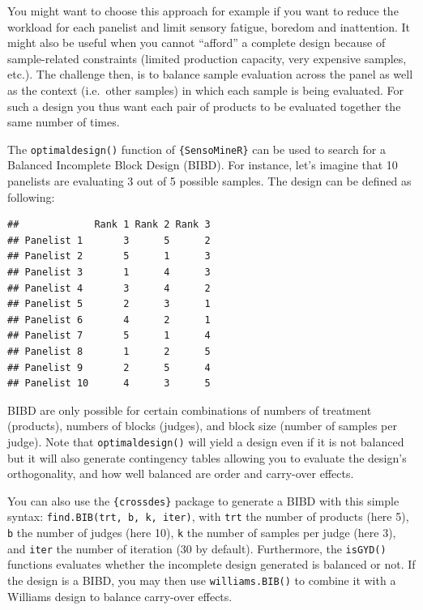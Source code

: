 \documentclass[
]{krantz}
\makeatletter
\newenvironment{Shaded}{\begin{snugshade}}{\end{snugshade}}
\newcommand{\AttributeTok}[1]{\textcolor[rgb]{0.61,0.61,0.61}{#1}}
\newcommand{\DecValTok}[1]{\textcolor[rgb]{0.06,0.06,0.06}{#1}}
\newcommand{\FunctionTok}[1]{\textcolor[rgb]{0,0,0}{#1}}
\newcommand{\NormalTok}[1]{#1}
\newcommand{\OtherTok}[1]{\textcolor[rgb]{0.37,0.37,0.37}{#1}}
\newcommand{\SpecialCharTok}[1]{\textcolor[rgb]{0,0,0}{#1}}
\newenvironment{kframe}{%
\medskip{}
\setlength{\fboxsep}{.8em}
 \def\at@end@of@kframe{}%
 \ifinner\ifhmode%
  \def\at@end@of@kframe{\end{minipage}}%
  \begin{minipage}{\columnwidth}%
 \fi\fi%
 \def\FrameCommand##1{\hskip\@totalleftmargin \hskip-\fboxsep
 \colorbox{shadecolor}{##1}\hskip-\fboxsep
     \hskip-\linewidth \hskip-\@totalleftmargin \hskip\columnwidth}%
 \MakeFramed {\advance\hsize-\width
   \@totalleftmargin\z@ \linewidth\hsize
   \@setminipage}}%
 {\par\unskip\endMakeFramed%
 \at@end@of@kframe}
\renewenvironment{Shaded}{\begin{kframe}}{\end{kframe}}
\makeatother
\begin{document}
You might want to choose this approach for example if you want to reduce the workload for each panelist and limit sensory fatigue, boredom and inattention. It might also be useful when you cannot ``afford'' a complete design because of sample-related constraints (limited production capacity, very expensive samples, etc.). The challenge then, is to balance sample evaluation across the panel as well as the context (i.e.~other samples) in which each sample is being evaluated. For such a design you thus want each pair of products to be evaluated together the same number of times.

The \texttt{optimaldesign()} function of \texttt{\{SensoMineR\}} can be used to search for a Balanced Incomplete Block Design (BIBD). For instance, let's imagine that 10 panelists are evaluating 3 out of 5 possible samples. The design can be defined as following:

\begin{Shaded}
\end{Shaded}

\begin{verbatim}
##             Rank 1 Rank 2 Rank 3
## Panelist 1       3      5      2
## Panelist 2       5      1      3
## Panelist 3       1      4      3
## Panelist 4       3      4      2
## Panelist 5       2      3      1
## Panelist 6       4      2      1
## Panelist 7       5      1      4
## Panelist 8       1      2      5
## Panelist 9       2      5      4
## Panelist 10      4      3      5
\end{verbatim}

BIBD are only possible for certain combinations of numbers of treatment (products), numbers of blocks (judges), and block size (number of samples per judge). Note that \texttt{optimaldesign()} will yield a design even if it is not balanced but it will also generate contingency tables allowing you to evaluate the design's orthogonality, and how well balanced are order and carry-over effects.

You can also use the \texttt{\{crossdes\}} package to generate a BIBD with this simple syntax: \texttt{find.BIB(trt,\ b,\ k,\ iter)}, with \texttt{trt} the number of products (here 5), \texttt{b} the number of judges (here 10), \texttt{k} the number of samples per judge (here 3), and \texttt{iter} the number of iteration (30 by default). Furthermore, the \texttt{isGYD()} functions evaluates whether the incomplete design generated is balanced or not. If the design is a BIBD, you may then use \texttt{williams.BIB()} to combine it with a Williams design to balance carry-over effects.
\end{document}

